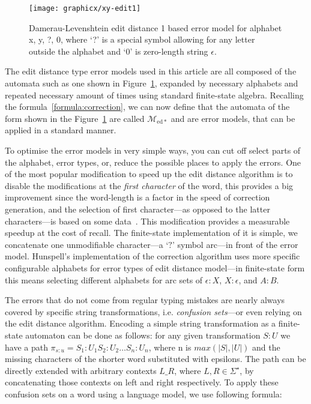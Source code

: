 \documentclass[a4paper,12pt]{article}
\begin{document}
\begin{figure}
    \centering
    \texttt{[image: graphicx/xy-edit1]}
    \caption{Damerau-Levenshtein edit distance 1 based error model for
        alphabet {x, y, ?, 0}, where `?' is a special symbol allowing for
        any letter outside the alphabet and `0' is zero-length string
        $\epsilon$.
    \label{fig:xy-edit-1}}
\end{figure}

The edit distance type error models used in this article are all composed of
the automata such as one shown in Figure~\ref{fig:xy-edit-1}, expanded by
necessary alphabets and repeated necessary amount of times using standard
finite-state algebra. Recalling the formula~\ref{formula:correction}, we can
now define that the automata of the form shown in the
Figure~\ref{fig:xy-edit-1} are called $\mathcal{M}_{\mathrm{ed*}}$ and are
error models, that can be applied in a standard manner.

To optimise the error models in very simple ways, you can cut off select parts
of the alphabet, error types, or, reduce the possible places to apply the
errors.  One of the most popular modification to speed up the edit distance
algorithm is to disable the modifications at the \emph{first character} of the
word, this provides a big improvement since the word-length is a factor in the
speed of correction generation, and the selection of first character---as
opposed to the latter characters---is based on some
data~\cite[]{bhagat2007spelling}.  This modification provides a
measurable speedup at the cost of recall. The finite-state implementation of it
is simple, we concatenate one unmodifiable character---a `$?$' symbol arc---in
front of the error model.  Hunspell's implementation of the correction
algorithm uses more specific configurable alphabets for error types of edit
distance model---in finite-state form this means selecting different alphabets
for arc sets of $\epsilon:X$, $X:\epsilon$, and $A:B$.

The errors that do not come from regular typing mistakes are nearly always
covered by specific string transformations, i.e.  \emph{confusion sets}---or
even relying on the edit distance algorithm.  Encoding a simple string
transformation as a finite-state automaton can be done as follows: for any
given transformation $S:U$ we have a path $\pi_{s:u} = S_1:U_1 S_2:U_2 \ldots
S_n:U_n$, where n is $max(|S|, |U|)$ and the missing characters of the shorter
word substituted with epsilons.  The path can be directly extended with
arbitrary contexts $L \_ R$, where $L, R \in \Sigma^{\star}$, by concatenating
those contexts on left and right respectively. To apply these confusion sets
on a word using a language model, we use following formula:
\end{document}
